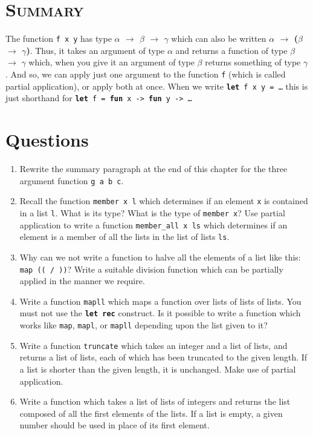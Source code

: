 \documentclass[]{book}
\newcommand{\pletrec}{\textbf{let rec}\xspace}
\begin{document}
\section*{\textsc{Summary}}

The function \texttt{f\! x\! y} has type \textrm{\textbf{$\alpha$ $\rightarrow$ $\beta$ $\rightarrow$ $\gamma$}} which can also be written \textrm{\textbf{$\alpha$ $\rightarrow$ \textmd{(}$\beta$ $\rightarrow$ $\gamma$\textmd{)}}}. Thus, it takes an argument of type $\alpha$ and returns a function of type $\beta$ $\rightarrow$ $\gamma$ which, when you give it an argument of type $\beta$ returns something of type $\gamma$. And so, we can apply just one argument to the function \texttt{f} (which is called partial application), or apply both at once. When we write \texttt{\textbf{let}\! f\! x\! y\! =\! \ldots} this is just shorthand for \texttt{\textbf{let}\! f\! =\! \textbf{fun}\! x\! ->\! \textbf{fun}\! y\! ->\! \ldots}
 
\clearpage
\section*{Questions}

\begin{enumerate}
  \item Rewrite the summary paragraph at the end of this chapter for the three argument function \texttt{g\! a\! b\! c}.
  \item Recall the function \texttt{member\! x\! l} which determines if an element \texttt{x} is contained in a list \texttt{l}. What is its type? What is the type of \texttt{member\! x}? Use partial application to write a function \texttt{member\_all\! x\! ls} which determines if an element is a member of all the lists in the list of lists \texttt{ls}. 
  \item Why can we not write a function to halve all the elements of a list like this: \texttt{map\! ((\! /\! ))\! [10;\! 20;\! 30]}? Write a suitable division function which can be partially applied in the manner we require.
  \item Write a function \texttt{mapll} which maps a function over lists of lists of lists. You must not use the \texttt{\pletrec} construct. Is it possible to write a function which works like \texttt{map}, \texttt{mapl}, or \texttt{mapll} depending upon the list given to it?
  \item Write a function \texttt{truncate} which takes an integer and a list of lists, and returns a list of lists, each of which has been truncated to the given length. If a list is shorter than the given length, it is unchanged. Make use of partial application.
  \item Write a function which takes a list of lists of integers and returns the list composed of all the first elements of the lists. If a list is empty, a given number should be used in place of its first element.
\end{enumerate}
\end{document}
